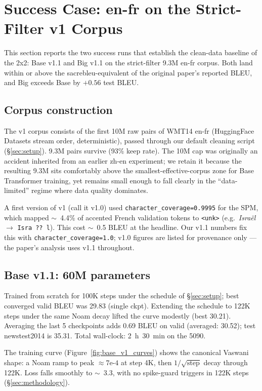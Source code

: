 \section{Success Case: en-fr on the Strict-Filter v1 Corpus}
\label{sec:enfr_v1}

This section reports the two success runs that establish the clean-data baseline of the 2x2: Base v1.1 and Big v1.1 on the strict-filter 9.3M en-fr corpus. Both land within or above the sacrebleu-equivalent of the original paper's reported BLEU, and Big exceeds Base by $+0.56$ test BLEU.

\subsection{Corpus construction}
\label{sec:v1_corpus}
The v1 corpus consists of the first 10M raw pairs of WMT14 en-fr (HuggingFace Datasets stream order, deterministic), passed through our default cleaning script (\S\ref{sec:setup}). 9.3M pairs survive (93\% keep rate). The 10M cap was originally an accident inherited from an earlier zh-en experiment; we retain it because the resulting 9.3M sits comfortably above the smallest-effective-corpus zone for Base Transformer training, yet remains small enough to fall clearly in the ``data-limited'' regime where data quality dominates.

A first version of v1 (call it v1.0) used \texttt{character\_coverage=0.9995} for the SPM, which mapped $\sim$~4.4\% of accented French validation tokens to \texttt{<unk>} (e.g.\ \textit{Israël} $\rightarrow$ \texttt{Isra ?? l}). This cost $\sim$~0.5 BLEU at the headline. Our v1.1 numbers fix this with \texttt{character\_coverage=1.0}; v1.0 figures are listed for provenance only --- the paper's analysis uses v1.1 throughout.

\subsection{Base v1.1: 60M parameters}
\label{sec:base_v1}
Trained from scratch for 100K steps under the schedule of \S\ref{sec:setup}; best converged valid BLEU was 29.83 (single ckpt). Extending the schedule to 122K steps under the same Noam decay lifted the curve modestly (best 30.21). Averaging the last 5 checkpoints adds 0.69 BLEU on valid (averaged: 30.52); test newstest2014 is 35.31. Total wall-clock: 2~h~30~min on the 5090.

The training curve (Figure~\ref{fig:base_v1_curves}) shows the canonical Vaswani shape: a Noam ramp to peak $\approx 7\text{e-}4$ at step 4K, then $1/\sqrt{\text{step}}$ decay through 122K. Loss falls smoothly to $\sim$~3.3, with no spike-guard triggers in 122K steps (\S\ref{sec:methodology}).

